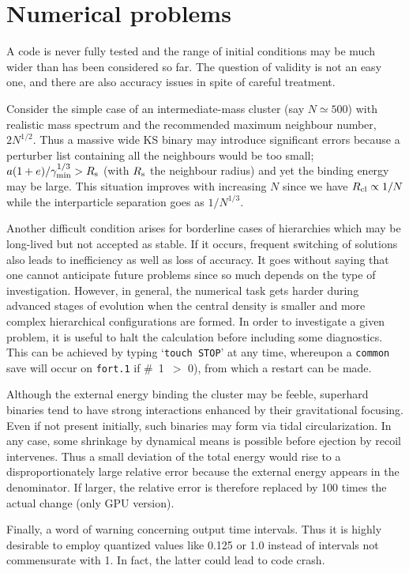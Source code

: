 \documentclass[12pt]{article}
\begin{document}
\section{Numerical problems}

A code is never fully tested and the range of initial conditions may be
much wider than has been considered so far.
The question of validity is not an easy one, and there are also accuracy
issues in spite of careful treatment.

Consider the simple case of an intermediate-mass cluster
(say $N \simeq 500$) with realistic mass spectrum and the recommended
maximum neighbour number, $2 N^{1/2}$.
Thus a massive wide KS binary may introduce significant errors because a
perturber list containing all the neighbours would be too small; \ie
$a (1 + e)/ \gamma_{\rm min}^{1/3} > R_{\rm s}$ (with $R_{\rm s}$ the
neighbour radius) and yet the binding energy may be large.
This situation improves with increasing $N$ since we have
$R_{\rm cl} \propto 1/N$ while the interparticle separation goes as
$1/N^{1/3}$.

Another difficult condition arises for borderline cases of hierarchies which
may be long-lived but not accepted as stable.
If it occurs, frequent switching of solutions also leads to inefficiency as
well as loss of accuracy.
It goes without saying that one cannot anticipate future problems since so
much depends on the type of investigation.
However, in general, the numerical task gets harder during advanced stages of
evolution when the central density is smaller and more complex hierarchical
configurations are formed.
In order to investigate a given problem, it is useful to halt the
calculation before including some diagnostics.
This can be achieved by typing `{\tt touch STOP}' at any time,
whereupon a {\tt common} save will occur on {\tt fort.1} if \#~1~$>$ 0),
from which a restart can be made.

Although the external energy binding the cluster may be feeble, superhard
binaries tend to have strong interactions enhanced by their gravitational
focusing.
Even if not present initially, such binaries may form via tidal
circularization.
In any case, some shrinkage by dynamical means is possible before ejection
by recoil intervenes.
Thus a small deviation of the total energy would rise to a
disproportionately large relative error because the external energy appears
in the denominator.
If larger, the relative error is therefore replaced by 100 times the actual
change (only GPU version).

Finally, a word of warning concerning output time intervals.
Thus it is highly desirable to employ quantized values like 0.125 or 1.0
instead of intervals not commensurate with 1. In fact, the latter could
lead to code crash.
\end{document}
